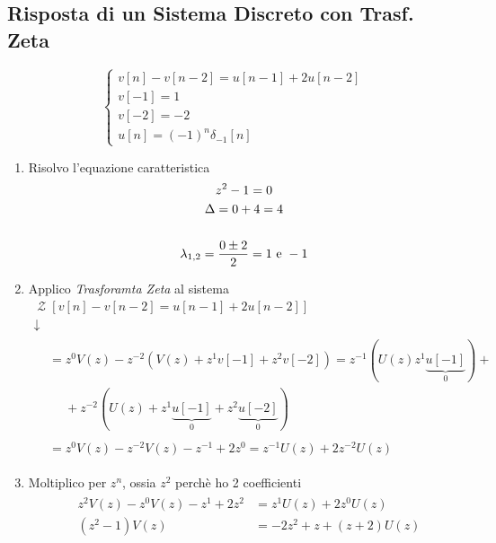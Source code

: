 \documentclass{article}
\newcommand{\Ztransf}{\mathop{\mathcal{Z}}}
\begin{document}
		\subsection{Risposta di un Sistema Discreto con Trasf. Zeta}
			\[
				\begin{cases}
					v[n] - v[n - 2] = u[n - 1] + 2u[n - 2] \\
					v[-1] = 1 \\
					v[-2] = -2 \\
					u[n] = (-1)^n \delta_{-1}[n]
				\end{cases}
			\]
			\begin{enumerate}
				\item Risolvo l'equazione caratteristica
					  \[
					  	\begin{gathered}
					  		z^2 - 1 = 0 \\
							\Delta = 0 + 4 = 4 \\
							\\
							\lambda_{1,2} = {{0 \pm 2}\over{2}} = 1 \text{ e } -1
					  	\end{gathered}
					  \]
				\item Applico \textit{Trasforamta Zeta} al sistema
					  \[
					  	\begin{gathered}
							\Ztransf[v[n] - v[n - 2] = u[n - 1] + 2u[n - 2]] \\
							\downarrow \\
							\begin{aligned}
								&= z^0 V(z) - z^{-2}(V(z) + z^1v[-1] + z^2v[-2]) = z^{-1}(U(z) z^1\underbrace{u[-1]}_{0}) + \\
								&\quad\; + z^{-2}(U(z) + z^1\underbrace{u[-1]}_{0} + z^2\underbrace{u[-2]}_{0}) \\
								\\
								&= z^0V(z) - z^{-2}V(z) - z^{-1} + 2z^0 = z^{-1}U(z) + 2z^{-2}U(z)
 							\end{aligned}
					  	\end{gathered}
					  \]
				\item Moltiplico per $ z^n $, ossia $ z^2 $ perchè ho 2 coefficienti
					  \[
					  	\begin{gathered}
					  		&\begin{aligned}
					  			z^2V(z) - z^0V(z) - z^1 + 2z^2 &= z^1U(z) + 2z^0U(z) \\
					  			(z^2 - 1)V(z) &= -2z^2 + z + (z + 2)U(z)
					  		\end{aligned} \\
					  		\\

\end{gathered}\]
\end{enumerate}
\end{document}
